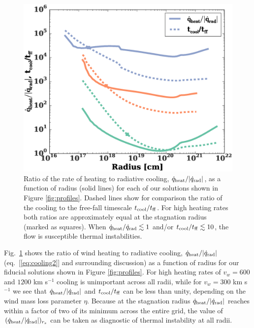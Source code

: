 \documentclass[usenatbib,fleqn]{mn2e}
\newcommand{\tcool}{t_{\rm cool}}
\newcommand{\tff}{t_{\rm ff}}
\begin{document}
\begin{figure}
  \includegraphics[width=\columnwidth]{cooling.eps}
  \caption{\label{fig:cooling} Ratio of the rate of heating to
radiative cooling, $\dot{q}_{\rm heat}/|\dot{q}_{\rm rad}|$, as a
function of radius (solid lines) for each of our solutions shown in
Figure \ref{fig:profiles}.  Dashed lines show for comparison the ratio
of the cooling to the free-fall timescale $t_{\rm cool}/t_{\rm ff}$.
For high heating rates both ratios are approximately equal at the
stagnation radius (marked as squares).  When $\dot{q}_{\rm
heat}/\dot{q}_{\rm rad} \lesssim 1$ and/or $t_{\rm cool}/t_{\rm ff}
\lesssim 10$, the flow is susceptible thermal instabilities.}
\end{figure}


Fig.~\ref{fig:cooling} shows the ratio of wind heating to radiative
cooling, $\dot{q}_{\rm heat}/|\dot{q}_{\rm rad}|$
(eq.~[\ref{eq:cooling2}] and surrounding discussion) as a function of
radius for our fiducial solutions shown in Figure \ref{fig:profiles}.
For high heating rates of $v_{w} = 600$ and $1200$ km s$^{-1}$ cooling
is unimportant across all radii, while for $v_{w} = 300$ km s$^{-1}$
we see that $\dot{q}_{\rm heat}/|\dot{q}_{\rm rad}|$ and $\tcool/\tff$
can be less than unity, depending on the wind mass loss parameter
$\eta$.  Because at the stagnation radius $\dot{q}_{\rm
  heat}/|\dot{q}_{\rm rad}|$ reaches within a factor
of two of its minimum across the entire grid, the value of $(\dot{q}_{\rm heat}/|\dot{q}_{\rm rad}|)_{r_{s}}$ can be taken as diagnostic of thermal instability at all radii.
\end{document}
